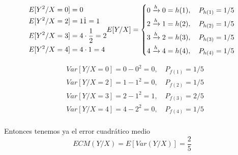 \documentclass[fleqn]{article}
\begin{document}
    \begin{equation*}
        \begin{aligned}
            &E[Y^2/X=0] = 0\\
            &E[Y^2/X=2] =1 \dot 1 = 1\\
            &E[Y^2/X=3] = 4\cdot\frac{1}{2} = 2\\
            &E[Y^2/X=4] = 4\cdot 1 = 4\\
        \end{aligned}\\
        E[Y/X]= \left\{
        \begin{aligned}
            &0 \xrightarrow{h} 0 = h(1), \quad P_{h(1)} = 1/5 \\
            &2 \xrightarrow{h} 1 = h(2), \quad P_{h(2)} = 1/5 \\
            &3 \xrightarrow{h} 2 = h(3), \quad P_{h(3)} = 1/5 \\
            &4 \xrightarrow{h} 4 = h(4), \quad P_{h(4)} = 1/5 \\
        \end{aligned}
        \right.
    \end{equation*}

    \begin{equation*}
        \begin{aligned}
            &Var[Y/X=0] = 0-0^2 = 0, \quad P_{f(1)} = 1/5\\
            &Var[Y/X=2] = 1-1^2 = 0, \quad P_{f(2)} = 1/5\\
            &Var[Y/X=3] = 2-1^2 = 1, \quad P_{f(3)} = 2/5\\
            &Var[Y/X=4] = 4-2^2 = 0, \quad P_{f(4)} = 1/5\\
        \end{aligned}
    \end{equation*}

    Entonces tenemos ya el error cuadrático medio
    $$ECM(Y/X) = E[Var(Y/X)] = \frac{2}{5}$$\\
\end{document}
